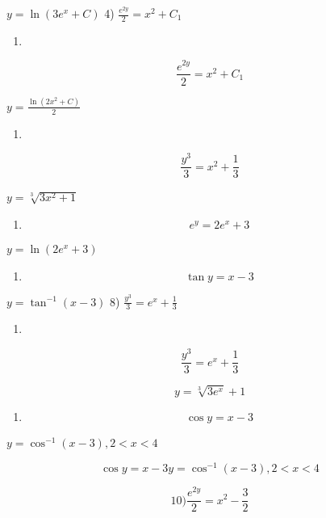 \documentclass[
]{article}
\providecommand{\tightlist}{%
  \setlength{\itemsep}{0pt}\setlength{\parskip}{0pt}}
\begin{document}
\(y = \ln (3e^x + C)\) 4) \(\frac{e^{2y}}{2} = x^2 + C_1\)

\begin{enumerate}
\def\labelenumi{\arabic{enumi})}
\setcounter{enumi}{3}
\tightlist
\item
\end{enumerate}

\[\frac{e^{2y}}{2} = x^2 + C_1\]

\(y = \frac{\ln(2x^2 + C)}{2}\)

\begin{enumerate}
\def\labelenumi{\arabic{enumi})}
\setcounter{enumi}{4}
\tightlist
\item
\end{enumerate}

\[\frac{y^3}{3} = x^2 + \frac{1}{3}\]

\(y = \sqrt[3]{3x^2 + 1}\)

\begin{enumerate}
\def\labelenumi{\arabic{enumi})}
\setcounter{enumi}{5}
\tightlist
\item
  \[e^y = 2e^x + 3\]
\end{enumerate}

\(y = \ln (2e^x + 3)\)

\begin{enumerate}
\def\labelenumi{\arabic{enumi})}
\setcounter{enumi}{6}
\tightlist
\item
  \[\tan y = x - 3\]
\end{enumerate}

\(y = \tan^{-1}(x - 3)\) 8) \(\frac{y^3}{3} = e^x + \frac{1}{3}\)

\begin{enumerate}
\def\labelenumi{\arabic{enumi})}
\setcounter{enumi}{7}
\tightlist
\item
\end{enumerate}

\[\frac{y^3}{3} = e^{x} + \frac{1}{3}\]

\[y = \sqrt[3]{3e^{x}} + 1\]

\begin{enumerate}
\def\labelenumi{\arabic{enumi})}
\setcounter{enumi}{8}
\tightlist
\item
  \[\cos y = x - 3\]
\end{enumerate}

\(y = \cos^{-1}(x - 3), 2 < x < 4\)

\[\cos y = x - 3 y = \cos^{-1}(x - 3), 2 < x < 4\]

\[10) \frac{e^{2y}}{2} = x^2 - \frac{3}{2}\]
\end{document}

